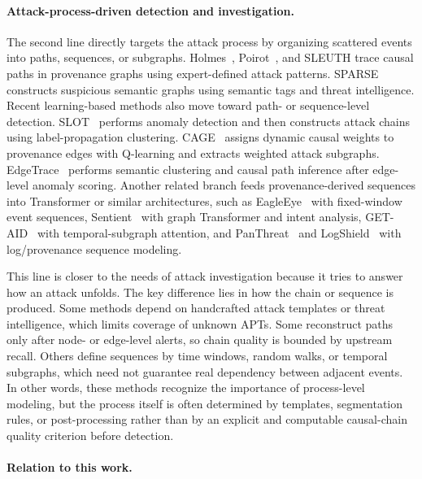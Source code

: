\paragraph{Attack-process-driven detection and investigation.}

The second line directly targets the attack process by organizing scattered events into paths, sequences, or subgraphs. Holmes~\cite{holmes2019}, Poirot~\cite{poirot2019}, and SLEUTH trace causal paths in provenance graphs using expert-defined attack patterns. SPARSE~\cite{sparse2024} constructs suspicious semantic graphs using semantic tags and threat intelligence. Recent learning-based methods also move toward path- or sequence-level detection. SLOT~\cite{slot2025} performs anomaly detection and then constructs attack chains using label-propagation clustering. CAGE~\cite{cage2025} assigns dynamic causal weights to provenance edges with Q-learning and extracts weighted attack subgraphs. EdgeTrace~\cite{edgetrace2025} performs semantic clustering and causal path inference after edge-level anomaly scoring. Another related branch feeds provenance-derived sequences into Transformer or similar architectures, such as EagleEye~\cite{eagleeye2024} with fixed-window event sequences, Sentient~\cite{sentient2026} with graph Transformer and intent analysis, GET-AID~\cite{getaid2025} with temporal-subgraph attention, and PanThreat~\cite{panthreat2025} and LogShield~\cite{logshield2024} with log/provenance sequence modeling.

This line is closer to the needs of attack investigation because it tries to answer how an attack unfolds. The key difference lies in how the chain or sequence is produced. Some methods depend on handcrafted attack templates or threat intelligence, which limits coverage of unknown APTs. Some reconstruct paths only after node- or edge-level alerts, so chain quality is bounded by upstream recall. Others define sequences by time windows, random walks, or temporal subgraphs, which need not guarantee real dependency between adjacent events. In other words, these methods recognize the importance of process-level modeling, but the process itself is often determined by templates, segmentation rules, or post-processing rather than by an explicit and computable causal-chain quality criterion before detection.

\paragraph{Relation to this work.}

